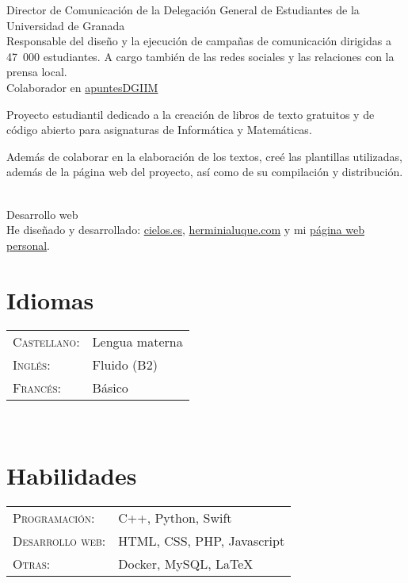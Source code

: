 \documentclass[11pt]{article} %
\begin{document}
 Director de Comunicación de la Delegación General de Estudiantes de la Universidad de Granada\\
{\color{gray} Responsable del diseño y la ejecución de campañas de comunicación dirigidas a 47~000 estudiantes. A cargo también de las redes sociales y las relaciones con la prensa local.}\\

Colaborador en \href{https://github.com/libreim/apuntesdgiim}{apuntesDGIIM}\\ 
{\color{gray} Proyecto estudiantil dedicado a la creación de libros de texto gratuitos y de código abierto para asignaturas de Informática y Matemáticas.

Además de colaborar en la elaboración de los textos, creé las plantillas utilizadas, además de la página web del proyecto, así como de su compilación y distribución.}\\

Desarrollo web\\
{\color{gray} He diseñado y desarrollado: \href{https://cielos.es}{cielos.es}, \href{https://herminialuque.com}{herminialuque.com} y mi \href{https://jmml.me}{página web personal}.}\\

\vspace{1cm}

\begin{minipage}[t]{0.5\textwidth}
	\section*{Idiomas}

	\begin{tabular}{@{}ll}
	\textsc{Castellano:} & Lengua materna\\

	\textsc{Inglés:} & Fluido (B2)\\

	\textsc{Francés:} & Básico\\
	\end{tabular}\\
\end{minipage}
\begin{minipage}[t]{0.5\textwidth}
	\section*{Habilidades}

	\begin{tabular}{@{}ll}
	\textsc{Programación:} & C++, Python, Swift\\

	\textsc{Desarrollo web:} & HTML, CSS, PHP, Javascript\\

	\textsc{Otras:} & Docker, MySQL, \LaTeX\\

	\end{tabular}\\
\end{minipage}
\end{document}
